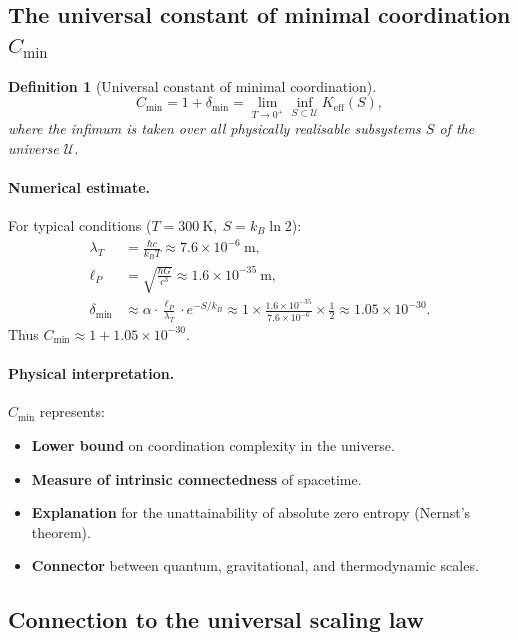 \documentclass[11pt,a4paper]{article}
\newtheorem{definition}{Definition}
\begin{document}
\subsection{The universal constant of minimal coordination \(C_{\min}\)}

\begin{definition}[Universal constant of minimal coordination]
	\[
	C_{\min} = 1 + \delta_{\min} = \lim_{T \to 0^+} \inf_{S \subset \mathcal{U}} K_{\mathrm{eff}}(S),
	\]
	where the infimum is taken over all physically realisable subsystems
	\(S\) of the universe \(\mathcal{U}\).
\end{definition}

\paragraph{Numerical estimate.}
For typical conditions (\(T = 300\ \mathrm{K},\ S = k_B \ln 2\)):
\begin{align*}
	\lambda_T &= \frac{\hbar c}{k_B T} \approx 7.6 \times 10^{-6}\ \mathrm{m},\\[2pt]
	\ell_P &= \sqrt{\frac{\hbar G}{c^3}} \approx 1.6 \times 10^{-35}\ \mathrm{m},\\[2pt]
	\delta_{\min} &\approx \alpha \cdot \frac{\ell_P}{\lambda_T} \cdot e^{-S/k_B}
	\approx 1 \times \frac{1.6 \times 10^{-35}}{7.6 \times 10^{-6}} \times \frac{1}{2}
	\approx 1.05 \times 10^{-30}.
\end{align*}
Thus \(C_{\min} \approx 1 + 1.05 \times 10^{-30}\).

\paragraph{Physical interpretation.}
\(C_{\min}\) represents:
\begin{itemize}
	\item \textbf{Lower bound} on coordination complexity in the universe.
	\item \textbf{Measure of intrinsic connectedness} of spacetime.
	\item \textbf{Explanation} for the unattainability of absolute zero entropy
	(Nernst's theorem).
	\item \textbf{Connector} between quantum, gravitational, and thermodynamic
	scales.
\end{itemize}

\subsection{Connection to the universal scaling law}
\end{document}
